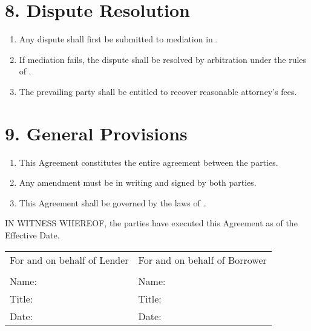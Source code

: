\documentclass[12pt]{ctexart}
\begin{document}
\section*{8. Dispute Resolution}
\begin{enumerate}[label=8.\arabic*]
    \item Any dispute shall first be submitted to mediation in \underline{\hspace{3cm}}.
    \item If mediation fails, the dispute shall be resolved by arbitration under the rules of \underline{\hspace{3cm}}.
    \item The prevailing party shall be entitled to recover reasonable attorney's fees.
\end{enumerate}

\section*{9. General Provisions}
\begin{enumerate}[label=9.\arabic*]
    \item This Agreement constitutes the entire agreement between the parties.
    \item Any amendment must be in writing and signed by both parties.
    \item This Agreement shall be governed by the laws of \underline{\hspace{3cm}}.
\end{enumerate}

IN WITNESS WHEREOF, the parties have executed this Agreement as of the Effective Date.

\vspace{2cm}

\begin{tabular}{p{8cm}p{8cm}}
For and on behalf of Lender & For and on behalf of Borrower \\
\underline{\hspace{6cm}} & \underline{\hspace{6cm}} \\
Name: \underline{\hspace{5cm}} & Name: \underline{\hspace{5cm}} \\
Title: \underline{\hspace{5cm}} & Title: \underline{\hspace{5cm}} \\
Date: \underline{\hspace{5cm}} & Date: \underline{\hspace{5cm}} \\
\end{tabular}
\end{document}
